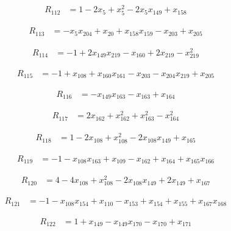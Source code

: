 \documentclass[11pt,letterpaper]{article}
\theoremstyle{definition}
\theoremstyle{remark}
\begin{document}
\begin{align*}
R_{112} &= 1 -2 x_{5} +x_{5}^{2} -2 x_{5} x_{149} +x_{158}
\end{align*}

\begin{align*}
R_{113} &= -x_{5} x_{204} +x_{20} +x_{158} x_{159} -x_{203} +x_{205}
\end{align*}

\begin{align*}
R_{114} &= -1 +2 x_{149} x_{219} -x_{160} +2 x_{219} -x_{219}^{2}
\end{align*}

\begin{align*}
R_{115} &= -1 +x_{108} +x_{160} x_{161} -x_{203} -x_{204} x_{219} +x_{205}
\end{align*}

\begin{align*}
R_{116} &= -x_{149} x_{163} -x_{163} +x_{164}
\end{align*}

\begin{align*}
R_{117} &= 2 x_{162} +x_{162}^{2} +x_{163}^{2} -x_{164}^{2}
\end{align*}

\begin{align*}
R_{118} &= 1 -2 x_{108} +x_{108}^{2} -2 x_{108} x_{149} +x_{165}
\end{align*}

\begin{align*}
R_{119} &= -1 -x_{108} x_{163} +x_{109} -x_{162} +x_{164} +x_{165} x_{166}
\end{align*}

\begin{align*}
R_{120} &= 4 -4 x_{108} +x_{108}^{2} -2 x_{108} x_{149} +2 x_{149} +x_{167}
\end{align*}

\begin{align*}
R_{121} &= -1 -x_{108} x_{154} +x_{110} -x_{153} +x_{154} +x_{155} +x_{167} x_{168}
\end{align*}

\begin{align*}
R_{122} &= 1 +x_{149} -x_{149} x_{170} -x_{170} +x_{171}
\end{align*}
\end{document}
